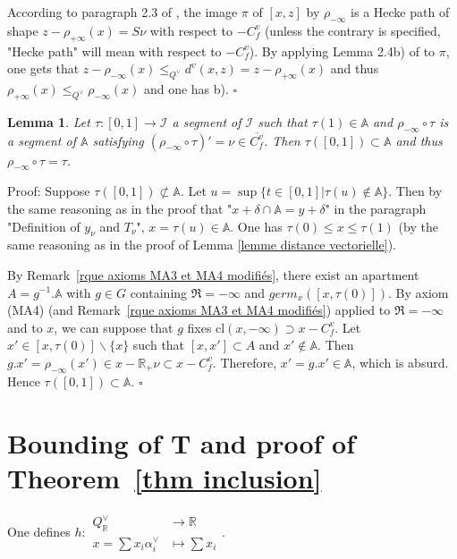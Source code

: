 \documentclass[12pt]{article}
\theoremstyle{plain}
\newtheorem{lemme}[thm]{Lemma}
\theoremstyle{definition}
\newcommand{\R}{\mathbb{R}}
\newcommand{\A}{\mathbb{A}}
\begin{document}
According to paragraph 2.3 of \cite{gaussent2014spherical}, the image $\pi$ of $[x,z]$ by $\rho_{-\infty}$ is a Hecke path of shape $z-\rho_{+\infty}(x)=S\nu$ with respect to $-C^v_f$ (unless the contrary is specified, "Hecke path" will mean with respect to $-C^v_f$). By applying Lemma 2.4b) of \cite{gaussent2014spherical} to $\pi$, one gets that $z-\rho_{-\infty}(x)\leq _{Q^\vee} d^v(x,z)=z-\rho_{+\infty}(x)$ and thus $\rho_{+\infty}(x)\leq_{Q^\vee} \rho_{-\infty}(x)$ and one has b). $\square$


\begin{lemme}\label{lemme image réciproque de segments}
Let $\tau:[0,1]\rightarrow \mathcal{I}$ a segment of $\mathcal{I}$ such that $\tau(1)\in \mathbb{A}$ and $\rho_{-\infty}\circ\tau$ is a segment of $\mathbb{A}$ satisfying  $(\rho_{-\infty}\circ\tau)'=\nu\in \overline{C^v_f}$. Then $\tau([0,1])\subset \mathbb{A}$ and thus $\rho_{-\infty}\circ \tau=\tau$.
\end{lemme}

Proof: Suppose $\tau([0,1])\not\subset \A$. Let $u=\sup\{t\in [0,1]|\tau(u)\notin \A\}$. Then by the same reasoning as in the proof that "$x+\delta\cap\A=y+\delta$" in the paragraph "Definition of $y_\nu$ and $T_\nu$", $x=\tau(u)\in\A$. One has $\tau(0)\leq x\leq \tau(1)$ (by the same reasoning as in the proof of Lemma \ref{lemme distance vectorielle}). 

By Remark~\ref{rque axioms MA3 et MA4 modifiés}, there exist an apartment $A=g^{-1}.\A$ with $g\in G$ containing $\mathfrak{R}=-\infty$ and $germ_x([x,\tau(0)])$. By axiom (MA4) (and Remark~\ref{rque axioms MA3 et MA4 modifiés}) applied to $\mathfrak{R}=-\infty$ and to $x$, we can suppose that $g$ fixes $\mathrm{cl}(x,-\infty)\supset x-C_f^v$.  
Let $x'\in [x,\tau(0)]\backslash\{x\}$ such that $[x,x']\subset A$ and $x'\notin \A$. Then $g.x'=\rho_{-\infty}(x')\in x-\R_+\nu\subset x-C_f^v$. Therefore, $x'=g.x'\in \A$, which is absurd. Hence $\tau([0,1])\subset \A$. $\square$





\section{Bounding of T and proof of Theorem~\ref{thm inclusion} }\label{sect bounding of T}


One defines $h:\begin{aligned} Q^\vee_{\mathbb{R}}& \rightarrow \mathbb{R}\\
x=\sum x_i\alpha_i^\vee & \mapsto \sum x_i\end{aligned}.$
\end{document}
